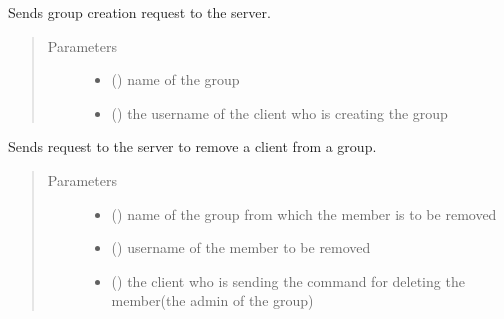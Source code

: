 \documentclass[letterpaper,10pt,english]{sphinxmanual}
\begin{document}

\begin{fulllineitems}
\label{\detokenize{client:client.create_group}}
Sends group creation request to the server.
\begin{quote}\begin{description}
\item[{Parameters}] \leavevmode\begin{itemize}
\item {} 
 () \textendash{} name of the group

\item {} 
 () \textendash{} the username of the client who is creating the group

\end{itemize}

\end{description}\end{quote}

\end{fulllineitems}


\begin{fulllineitems}
\label{\detokenize{client:client.delete_member}}
Sends request to the server to remove a client from a group.
\begin{quote}\begin{description}
\item[{Parameters}] \leavevmode\begin{itemize}
\item {} 
 () \textendash{} name of the group from which the member is to be removed

\item {} 
 () \textendash{} username of the member to be removed

\item {} 
 () \textendash{} the client who is sending the command for deleting the member(the admin of the group)

\end{itemize}

\end{description}\end{quote}

\end{fulllineitems}
\end{document}
